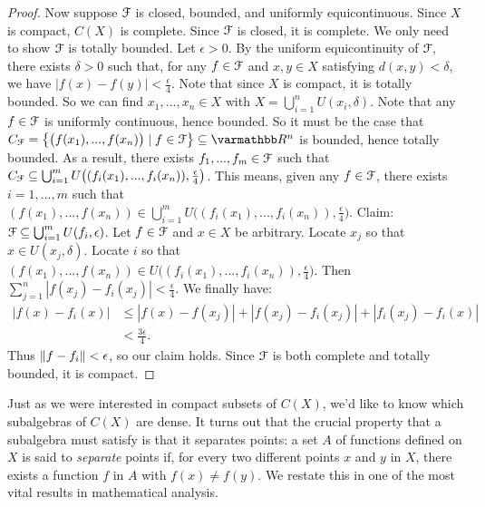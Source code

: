 \begin{proof}
            Now suppose $\mathcal{F}$ is closed, bounded, and uniformly equicontinuous. Since $X$ is compact, $C(X)$ is complete. Since $\mathcal{F}$ is closed, it is complete. We only need to show $\mathcal{F}$ is totally bounded. Let $\epsilon > 0$. By the uniform equicontinuity of $\mathcal{F}$, there exists $\delta > 0$ such that, for any $f \in \mathcal{F}$ and $x,y \in X$ satisfying $d(x,y) < \delta$, we have $|f(x) - f(y)| < \frac{\epsilon}{4}$. Note that since $X$ is compact, it is totally bounded. So we can find $x_1,...,x_n \in X$ with $X = \bigcup_{ i =1}^n U(x_i,\delta)$. Note that any $f \in \mathcal{F}$ is uniformly continuous, hence bounded. So it must be the case that $C_{\cF} = \bigl\{\bigl(f(x_1),...,f(x_n)\bigr) \mid f \in \cF  \bigr\} \subseteq \bfR^n$ is bounded, hence totally bounded. As a result, there exists $f_1,...,f_m \in \mathcal{F}$ such that $C_{\mathcal{F}} \subseteq \bigcup_{i = 1}^m U \bigl( (f_i(x_1),...,f_i(x_n)), \frac{\epsilon}{4}\bigr)$. This means, given any $f \in \mathcal{F}$, there exists $i=1,...,m$ such that $(f(x_1),...,f(x_n)) \in \bigcup_{i = 1}^m U \bigl( (f_i(x_1),...,f_i(x_n)), \frac{\epsilon}{4}\bigr)$. Claim: $\mathcal{F} \subseteq \bigcup_{i = 1}^m U(f_i,\epsilon)$. Let $f \in \mathcal{F}$ and $x \in X$ be arbitrary. Locate $x_j$ so that $x \in U(x_j,\delta)$. Locate $i$ so that $(f(x_1),...,f(x_n)) \in U \bigl( (f_i(x_1),...,f_i(x_n)), \frac{\epsilon}{4}\bigr)$. Then $\sum_{j = 1}^n |f(x_j) - f_i(x_j)| < \frac{\epsilon}{4}$. We finally have:
                \begin{equation*}
                \begin{split}
                    |f(x) - f_i(x)| 
                    & \leq |f(x) - f(x_j)| + |f(x_j) - f_i(x_j)| + |f_i(x_j) - f_i(x)| \\
                    & < \frac{3\epsilon}{4}.
                \end{split}
                \end{equation*}
            Thus $\left\lVert f - f_i \right\rVert < \epsilon$, so our claim holds. Since $\mathcal{F}$ is both complete and totally bounded, it is compact.
        \end{proof}

    Just as we were interested in compact subsets of $C(X)$, we'd like to know which subalgebras of $C(X)$ are dense. It turns out that the crucial property that a subalgebra must satisfy is that it separates points: a set $A$ of functions defined on $X$ is said to \textit{separate} points if, for every two different points $x$ and $y$ in $X$, there exists a function $f$ in $A$ with $f(x) \neq f(y)$. We restate this in one of the most vital results in mathematical analysis.


